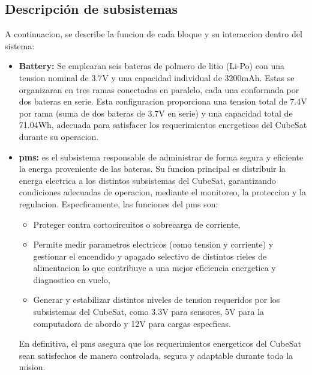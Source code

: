   \subsection{Descripción de subsistemas}
    A continuacion, se describe la funcion de cada bloque y su interaccion dentro del sistema:
    \begin{itemize}
      \item \textbf{Battery:} Se emplearan seis bateras de polmero de litio (Li-Po) con una tension nominal de 3.7V
      y una capacidad individual de 3200mAh. Estas se organizaran en tres ramas
      conectadas en paralelo, cada una conformada por dos bateras en serie. Esta configuracion proporciona una tension total de 7.4V por rama (suma de dos bateras de 3.7V en
      serie) y una capacidad total de 71.04Wh, adecuada para satisfacer los requerimientos
      energeticos del CubeSat durante su operacion.

      \item \textbf{\acrfull{pms}:} es el subsistema responsable de administrar
      de forma segura y eficiente la energa proveniente de las bateras. Su funcion principal es
      distribuir la energa electrica a los distintos subsistemas del CubeSat, garantizando condiciones adecuadas de operacion, mediante el monitoreo, la proteccion y la regulacion.
      Especficamente, las funciones del \acrshort{pms} son:
      \begin{itemize}
        \item Proteger contra cortocircuitos o sobrecarga de corriente,
        \item Permite medir parametros electricos (como tension y corriente) y gestionar el
          encendido y apagado selectivo de distintos rieles de alimentacion lo que contribuye
          a una mejor eficiencia energetica y diagnostico en vuelo,
        \item Generar y estabilizar distintos niveles de tension requeridos por los subsistemas
          del CubeSat, como 3.3V para sensores, 5V para la computadora de abordo y 12V
          para cargas especficas.
      \end{itemize}

      En definitiva, el \acrshort{pms} asegura que los requerimientos energeticos del CubeSat sean
      satisfechos de manera controlada, segura y adaptable durante toda la mision.


\end{itemize}
